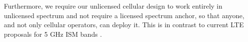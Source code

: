 Furthermore, we require our unlicensed cellular design to work entirely in unlicensed spectrum and not require a licensed spectrum anchor, so that anyone, and not only cellular operators, can deploy it. This is in contrast to current LTE proposals for 5 GHz ISM bands \cite{lteuforum_lteu, jian2015coexistence, radisys-lte}. 










